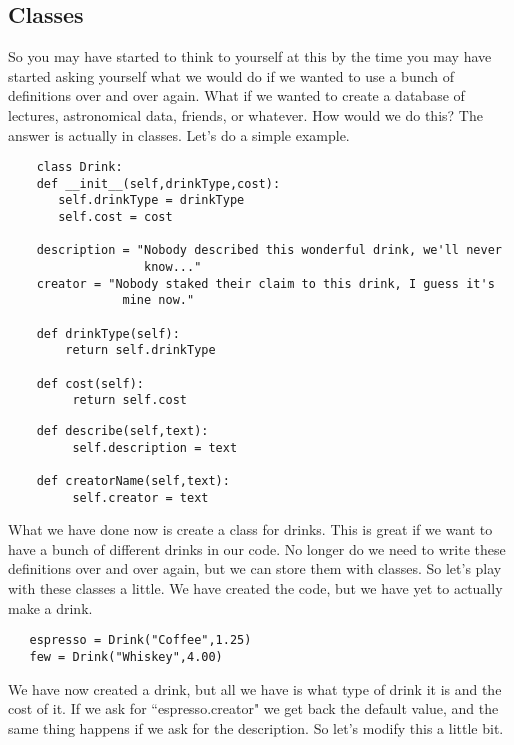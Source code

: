 \documentclass[11pt]{article}   %
\begin{document}
\subsection*{Classes}
So you may have started to think to yourself at this by the time you may have started asking yourself what we would do if we wanted to use a bunch of 
definitions over and over again.  What if we wanted to create a database of lectures, astronomical data, friends, or whatever.  How would we do this?
The answer is actually in classes.  Let's do a simple example.  
\begin{tcolorbox}
   \begin{lstlisting}
    class Drink:
    def __init__(self,drinkType,cost):
       self.drinkType = drinkType
       self.cost = cost

    description = "Nobody described this wonderful drink, we'll never 
                   know..."
    creator = "Nobody staked their claim to this drink, I guess it's 
                mine now."

    def drinkType(self):
        return self.drinkType

    def cost(self):
         return self.cost
   \end{lstlisting}
\end{tcolorbox}
\begin{tcolorbox}
   \begin{lstlisting}
    def describe(self,text):
         self.description = text

    def creatorName(self,text):
         self.creator = text
   \end{lstlisting}
\end{tcolorbox}
What we have done now is create a class for drinks.  This is great if we want to have a bunch of different drinks in our code.  No longer do we need to 
write these definitions over and over again, but we can store them with classes.  So let's play with these classes a little.  We have created the code, but 
we have yet to actually make a drink.
\begin{tcolorbox}
   \begin{lstlisting}
   espresso = Drink("Coffee",1.25)
   few = Drink("Whiskey",4.00)
   \end{lstlisting}
\end{tcolorbox}
We have now created a drink, but all we have is what type of drink it is and the cost of it.  If we ask for ``espresso.creator" we get back the default value,
and the same thing happens if we ask for the description.  So let's modify this a little bit.
\end{document}
